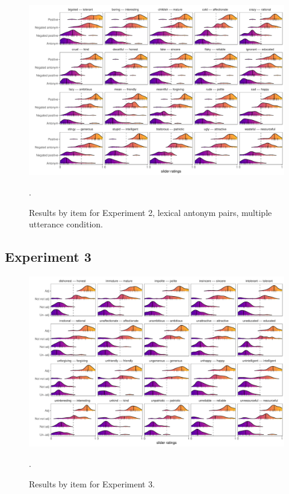 \documentclass[floatsintext,doc]{apa6}
\begin{document}
\begin{figure}[t]
\centering \includegraphics{figs/cogsci_expt2_lex_multiUtt_byItem_densities.pdf} 
\caption{Results by item for Experiment 2, lexical antonym pairs, multiple utterance condition.}.\label{fig:items_lex_multiUtt_expt2}
\end{figure}


\subsection{Experiment 3}


\begin{figure}[t]
\centering \includegraphics{figs/expt3_byItem_densities.pdf}
\caption{Results by item for Experiment 3.}.\label{fig:items_expt3}
\end{figure}



\newpage
\end{document}
